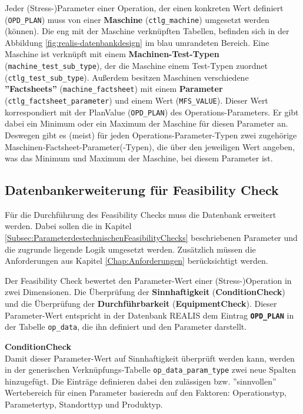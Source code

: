 Jeder (Stress-)Parameter einer Operation, der einen konkreten Wert definiert (\texttt{OPD\_\-PLAN}) muss von einer \textbf{Maschine} (\texttt{ctlg\_machine}) umgesetzt werden (können). Die eng mit der Maschine verknüpften Tabellen, befinden sich in der Abbildung \ref{fig:realis-datenbankdesign} im blau umrandeten Bereich. Eine Maschine ist verknüpft mit einem \textbf{Machinen-Test-Typen} (\texttt{machine\_test\_sub\_type}), der die Maschine einem Test-Typen zuordnet (\texttt{ctlg\_test\_sub\_type}). Außerdem besitzen Maschinen verschiedene \textbf{''Factsheets''} (\texttt{machine\_factsheet}) mit einem \textbf{Parameter} (\texttt{ctlg\_factsheet\_parameter}) und einem Wert (\texttt{MFS\_VALUE}). Dieser Wert korrespondiert mit der PlanValue (\texttt{OPD\_PLAN}) des Operations-Parameters. 
Er gibt dabei ein Minimum oder ein Maximum der Maschine für diesen Parameter an. Deswegen gibt es (meist) für jeden Operations-Parameter-Typen zwei zugehörige Maschinen-Factsheet-Parameter(-Typen), die über den jeweiligen Wert angeben, was das Minimum und Maximum der Maschine, bei diesem Parameter ist.


\subsection{Datenbankerweiterung für Feasibility Check}

Für die Durchführung des Feasibility Checks muss die Datenbank erweitert werden. Dabei sollen die in Kapitel \ref{Subsec:ParameterdestechnischenFeasibilityChecks} beschriebenen Parameter und die zugrunde liegende Logik umgesetzt werden. Zusätzlich müssen die Anforderungen aus Kapitel \ref{Chap:Anforderungen} berücksichtigt werden.

Der Feasibility Check bewertet den Parameter-Wert einer (Stress-)Operation in zwei Dimensionen. Die Überprüfung der \textbf{Sinnhaftigkeit} (\textbf{\gls{ConditionCheck}}) und die Überprüfung der \textbf{Durchführbarkeit} (\textbf{\gls{EquipmentCheck}}). 
Dieser Parameter-Wert entspricht in der Datenbank REALIS dem Eintrag \textbf{\texttt{OPD\_PLAN}} in der Tabelle \texttt{op\_data}, die ihn definiert und den Parameter darstellt.

\textbf{\gls{ConditionCheck}} \\
Damit dieser Parameter-Wert auf Sinnhaftigkeit überprüft werden kann, werden in der generischen Verknüpfungs-Tabelle \texttt{op\_data\_param\_type} zwei neue Spalten hinzugefügt. Die Einträge definieren dabei den zulässigen bzw. ''sinnvollen'' Wertebereich für einen Parameter basieredn auf den Faktoren: Operationstyp, Parametertyp, Standorttyp und Produktyp.

